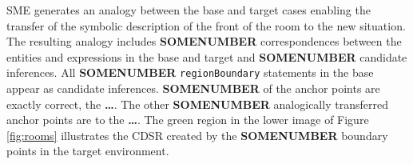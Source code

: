 \documentclass[letterpaper]{article}
\newcommand{\fw}[1]{\texttt{#1}}
\begin{document}
SME generates an analogy between the base and target cases enabling the transfer of the symbolic description of the front of the room to the new situation. The resulting analogy includes \textbf{SOMENUMBER} correspondences between the entities and expressions in the base and target and \textbf{SOMENUMBER} candidate inferences.  All \textbf{SOMENUMBER} \fw{regionBoundary} statements in the base appear as candidate inferences. \textbf{SOMENUMBER} of the anchor points are exactly correct, the \textbf{\dots}. The other \textbf{SOMENUMBER} analogically transferred anchor points are to the \textbf{\dots}. The green region in the lower image of Figure \ref{fig:rooms} illustrates the CDSR created by the \textbf{SOMENUMBER} boundary points in the target environment. 




%
% 
\end{document}

